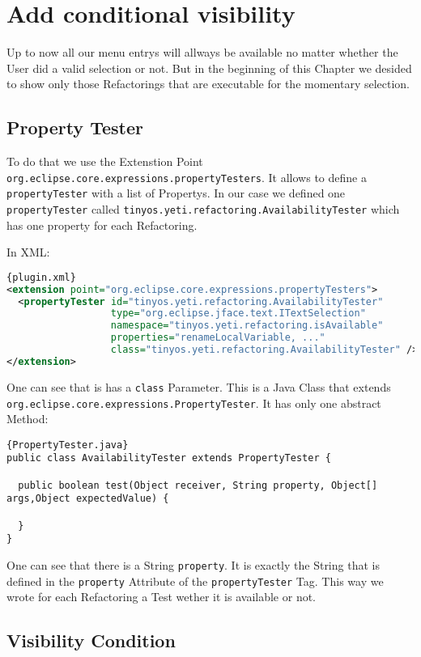 \documentclass[a4paper,10pt]{report}
\begin{document}
\section{Add conditional visibility}
Up to now all our menu entrys will allways be available no matter whether the User did a valid selection or not. But in the beginning of this Chapter we desided to show only 
those Refactorings that are executable for the momentary selection.
\subsection{Property Tester}
To do that we use the Extenstion Point \verb!org.eclipse.core.expressions.propertyTesters!. It allows to define a \verb!propertyTester! with a list of Propertys. In our
case we defined one \verb!propertyTester! called \verb!tinyos.yeti.refactoring.AvailabilityTester! which has one property for each Refactoring.

In XML:
\begin{lstlisting}[language=XML,caption=Property Tester ({\it plugin.xml})]{plugin.xml}
<extension point="org.eclipse.core.expressions.propertyTesters">
  <propertyTester id="tinyos.yeti.refactoring.AvailabilityTester"
                  type="org.eclipse.jface.text.ITextSelection"
                  namespace="tinyos.yeti.refactoring.isAvailable"
                  properties="renameLocalVariable, ..."
                  class="tinyos.yeti.refactoring.AvailabilityTester" />
</extension>
\end{lstlisting}

One can see that is has a \verb!class! Parameter. This is a Java Class that extends \verb!org.eclipse.core.expressions.PropertyTester!. It has only one abstract Method:
\begin{lstlisting}[caption=extends PropertyTester]{PropertyTester.java}
public class AvailabilityTester extends PropertyTester {

  public boolean test(Object receiver, String property, Object[] args,Object expectedValue) {
    
  }
}
\end{lstlisting}
One can see that there is a String \verb!property!. It is exactly the String that is defined in the \verb!property! Attribute of the \verb!propertyTester! Tag.
This way we wrote for each Refactoring a Test wether it is available or not.

\subsection{Visibility Condition}
\end{document}
